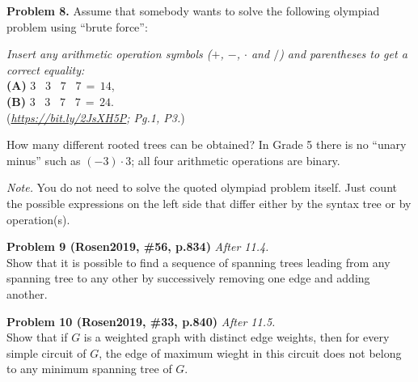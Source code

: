 \documentclass[jou]{apa6}
\begin{document}
\vspace{6pt}
{\bf Problem 8.}
Assume that somebody wants to solve the following olympiad problem using ``brute force'':
\begin{mdframed}[roundcorner=6pt]
{\em Insert any arithmetic operation symbols ($+$, $-$, $\cdot$ and $/$) and
parentheses to get a correct equality:}\\
{\bf (A)} $3\;\;\;3\;\;\;7\;\;\;7\,=\,14$,\\
{\bf (B)} $3\;\;\;3\;\;\;7\;\;\;7\,=\,24$.\\
({\em \url{https://bit.ly/2JsXH5P}; Pg.1, P3.})
\end{mdframed}
How many different rooted trees can be obtained?
In Grade 5 there is no ``unary minus'' such as $(-3)\cdot 3$;
all four arithmetic operations are binary.

{\em Note.} 
You do not need to solve the quoted olympiad 
problem itself. Just count the possible expressions on the left side
that differ either by the syntax tree or by operation(s).

\vspace{6pt}
{\bf Problem 9 (Rosen2019, \#56, p.834)} \textendash{} {\em After 11.4.}\\
Show that it is possible to find a sequence of spanning trees leading from any spanning tree
to any other by successively removing one edge and adding another.

\vspace{6pt}
{\bf Problem 10 (Rosen2019, \#33, p.840)} \textendash{} {\em After 11.5.}\\
Show that if $G$ is a weighted graph with distinct edge weights, then for every simple
circuit of $G$, the edge of maximum wieght in this circuit 
does not belong to any minimum spanning tree of $G$.
\end{document}
